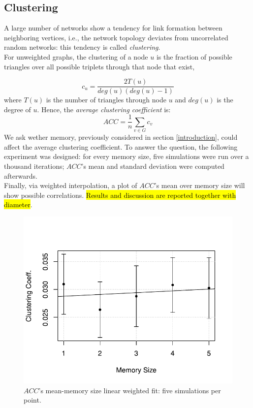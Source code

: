 \subsection{Clustering} \label{clustering}
A large number of networks show a tendency for link formation
between neighboring vertices, i.e., the network topology deviates
from uncorrelated random networks: this tendency is called
\textit{clustering}\cite{clusterarticle}. \\
For unweighted graphs, the clustering of a node $u$ is the fraction
of possible triangles over all possible triplets
through that node that exist\cite{clustersite},

\begin{equation}
\label{eq:clustering}
c_u = \frac{2 T(u)}{deg(u)(deg(u)-1)}
\end{equation}
where $T(u)$ is the number of triangles through node $u$ and $deg(u)$ is the degree of $u$.
Hence, the \textit{average clustering coefficient}  is:
\begin{equation}
\label{eq:average_clustering}
ACC = \frac{1}{n}\sum_{v \in G} c_v
\end{equation}
We ask wether memory, previously considered in section
\ref{introduction}, could affect the average clustering coefficient.
To answer the question, the following experiment was designed:
for every memory size, five simulations were run over a thousand
iterations; $ACC$'s mean and standard deviation were computed
afterwards.\\
Finally, via weighted interpolation, a plot of $ACC$'s mean
over memory size will show possible  correlations.
\hl{Results and discussion are reported together with diameter}.
\begin{figure}[h]
  \centering
  \includegraphics[trim={0cm 0cm 0cm 1cm},clip,width=.8\columnwidth]{img/clustering.pdf}
  \caption{$ACC$'s mean-memory size linear weighted fit: five simulations per point.}
  \label{fig:clustering}
\end{figure}
